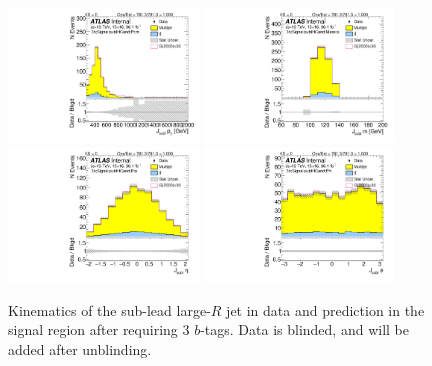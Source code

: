 \begin{figure}[htbp!]
\begin{center}
\includegraphics[angle=270, width=0.45\textwidth]{./figures/boosted/Signal/b77_ThreeTag_Signal_sublHCand_Pt_m_blind.pdf}
\includegraphics[angle=270, width=0.45\textwidth]{./figures/boosted/Signal/b77_ThreeTag_Signal_sublHCand_Mass_s_blind.pdf}\\
\includegraphics[angle=270, width=0.45\textwidth]{./figures/boosted/Signal/b77_ThreeTag_Signal_sublHCand_Eta_blind.pdf}
\includegraphics[angle=270, width=0.45\textwidth]{./figures/boosted/Signal/b77_ThreeTag_Signal_sublHCand_Phi_blind.pdf}
  \caption{Kinematics of the sub-lead large-$R$ jet in data and prediction in the signal region after requiring 3 $b$-tags. Data is blinded, and will be added after unblinding.}
  \label{fig:boosted-3b-signal-blind-ak10-subl}
\end{center}
\end{figure}

